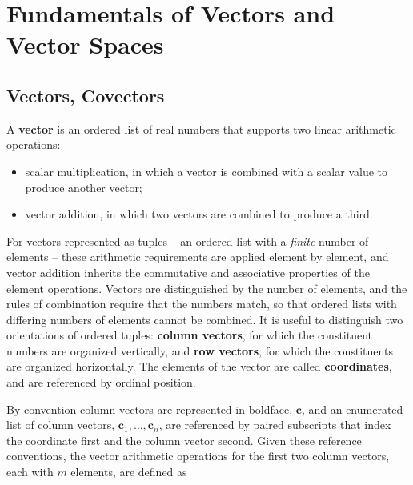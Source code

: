 \documentclass[12pt, twoside, draft]{article}
\begin{document}
\section{Fundamentals of Vectors and Vector Spaces}
\subsection{Vectors, Covectors}\label{sec:vectors-covectors}

A \textbf{vector} is an ordered list of real numbers that supports two linear arithmetic operations:
\begin{itemize}[noitemsep]
\item scalar multiplication, in which a vector is combined with a scalar value to produce another vector;
\item vector addition, in which two vectors are combined to produce a third.
\end{itemize}

For vectors represented as tuples -- an ordered list with a \textit{finite} number of elements -- these arithmetic requirements are applied element by element, and vector addition inherits the commutative and associative properties of the element operations.  Vectors are distinguished by the number of elements, and the rules of combination require that the numbers match, so that ordered lists with differing numbers of elements cannot be combined.  It is useful to distinguish two orientations of ordered tuples: \textbf{column vectors}, for which the constituent numbers are organized vertically, and \textbf{row vectors}, for which the constituents are organized horizontally.  The elements of the vector are called \textbf{coordinates}, and are referenced by ordinal position.

By convention column vectors are represented in boldface, $\mathbf{c}$, and an enumerated list of column vectors, $\mathbf{c}_1, \ldots, \mathbf{c}_n$, are referenced by paired subscripts that index the coordinate first and the column vector second.  Given these reference conventions, the vector arithmetic operations for the first two column vectors, each with $m$ elements, are defined as
\end{document}
